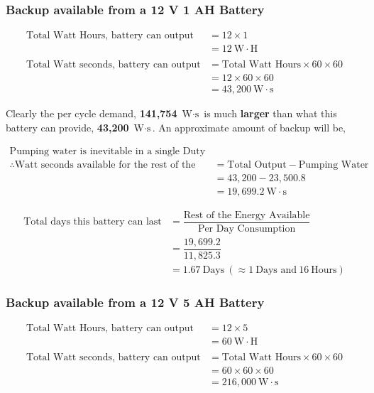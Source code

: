 \documentclass[../main.tex]{subfiles}
\begin{document}
\subsubsection{Backup available from a 12 V 1 AH Battery}

\begin{align*}
    \mbox{Total Watt Hours, battery can output} &= 12 \times 1 \\
    &= 12 \: \mbox{W} \cdot \mbox{H} \\ \\
    \mbox{Total Watt seconds, battery can output} &= \mbox{Total Watt Hours} \times 60 \times 60 \\
    &= 12 \times 60 \times 60 \\
    &= 43,200 \: \mbox{W} \cdot \mbox{s}
\end{align*}

Clearly the per cycle demand, \textbf{141,754} $\mbox{W} \cdot \mbox{s}$
is much \textbf{larger} than what this battery can provide, \textbf{43,200}
$\mbox{W} \cdot \mbox{s}$. An approximate amount of backup will be,

\begin{align*}
    \mbox{Pumping water is inevitable in a single Duty Cycle.} \\
    \therefore \mbox{Watt seconds available for the rest of the Cycle} &= \mbox{Total Output} - \mbox{Pumping Water} \\
    &= 43,200 - 23,500.8 \\
    &= 19,699.2 \: \mbox{W} \cdot \mbox{s}
\end{align*}

\begin{align*}
    \mbox{Total days this battery can last} &= \dfrac{\mbox{Rest of the Energy Available}}{\mbox{Per Day Consumption}} \\
    &= \dfrac{19,699.2}{11,825.3} \\
    &= 1.67 \: \mbox{Days} \: (\approx 1 \: \mbox{Days and} \: 16 \: \mbox{Hours})
\end{align*}

\subsubsection{Backup available from a 12 V 5 AH Battery}

\begin{align*}
    \mbox{Total Watt Hours, battery can output} &= 12 \times 5 \\
    &= 60 \: \mbox{W} \cdot \mbox{H} \\ \\
    \mbox{Total Watt seconds, battery can output} &= \mbox{Total Watt Hours} \times 60 \times 60 \\
    &= 60 \times 60 \times 60 \\
    &= 216,000 \: \mbox{W} \cdot \mbox{s}
\end{align*}
\end{document}
